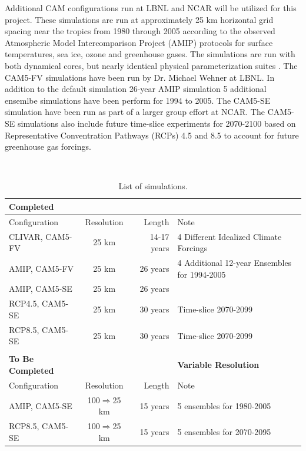 \documentclass[11pt]{article}
\begin{document}
Additional CAM configurations run at LBNL and NCAR will be utilized for this project. These simulations are run at approximately 25 km horizontal grid spacing near the tropics from 1980 through 2005 according to the observed Atmospheric Model Intercomparison Project (AMIP) protocols \citep{Gates1992,Gates1999} for surface temperatures, sea ice, ozone and greenhouse gases. The simulations are run with both dynamical cores, but nearly identical physical parameterization suites \citep{RBNetal2010NCAR}. The CAM5-FV simulations have been run by Dr. Michael Wehner at LBNL. In addition to the default simulation 26-year AMIP simulation 5 additional ensemlbe simulations have been perform for 1994 to 2005. The CAM5-SE simulation have been run as part of a larger group effort at NCAR. The CAM5-SE simulations also include future time-slice experiments for 2070-2100 based on Representative Conventration Pathways (RCPs) 4.5 and 8.5 to account for future greenhouse gas forcings. 

\begin{table} 
\begin{center}
\caption{List of simulations.\label{t:runs} }
\ \\
\begin{tabular}{l c r l}
\textbf{Completed} \\
\hline
Configuration & Resolution & Length & Note \\ 
\hline
CLIVAR, CAM5-FV & 25 km & 14-17 years & 4 Different Idealized Climate Forcings  \\
AMIP, CAM5-FV & 25 km & 26 years    & 4 Additional 12-year Ensembles for 1994-2005 \\
AMIP, CAM5-SE & 25 km & 26 years    & \\
RCP4.5, CAM5-SE & 25 km & 30 years    & Time-slice 2070-2099 \\
RCP8.5, CAM5-SE & 25 km & 30 years    & Time-slice 2070-2099 \\
\hline
\\
\textbf{To Be Completed} & & & \textbf{Variable Resolution}\\
\hline
Configuration & Resolution & Length & Note \\ 
\hline
AMIP, CAM5-SE & 100$\Rightarrow$25 km & 15 years    & 5 ensembles for 1980-2005 \\
RCP8.5, CAM5-SE & 100$\Rightarrow$25 km & 15 years    & 5 ensembles for 2070-2095 \\
\hline
\end{tabular}
\end{center}
\end{table}
\end{document}

